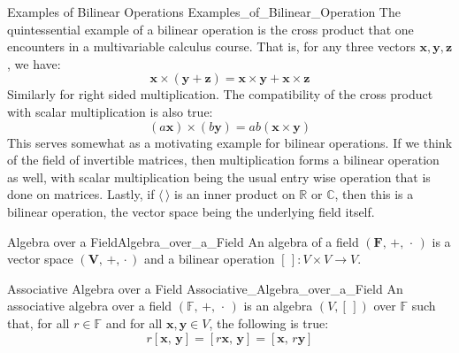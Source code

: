     \begin{lexample}{Examples of Bilinear Operations}
                    {Examples_of_Bilinear_Operation}
        The quintessential example of a bilinear operation is the
        cross product that one encounters in a multivariable calculus
        course. That is, for any three vectors
        $\mathbf{x},\mathbf{y},\mathbf{z}$, we have:
        \begin{equation}
            \mathbf{x}\times(\mathbf{y}+\mathbf{z})=
            \mathbf{x}\times\mathbf{y}+\mathbf{x}\times\mathbf{z}
        \end{equation}
        Similarly for right sided multiplication. The compatibility of
        the cross product with scalar multiplication is also true:
        \begin{equation}
            (a\mathbf{x})\times(b\mathbf{y})=ab(\mathbf{x}\times\mathbf{y})
        \end{equation}
        This serves somewhat as a motivating example for bilinear
        operations. If we think of the field of invertible matrices,
        then multiplication forms a bilinear operation as well, with
        scalar multiplication being the usual entry wise operation that
        is done on matrices. Lastly, if $\langle\,\rangle$ is an inner
        product on $\mathbb{R}$ or $\mathbb{C}$, then this is a bilinear
        operation, the vector space being the underlying field itself.
    \end{lexample}
    \begin{fdefinition}{Algebra over a Field}{Algebra_over_a_Field}
        An algebra of a field $(\mathbf{F},\,+,\,\cdot\,)$ is a
        vector space $(\mathbf{V},\,\boldsymbol{+},\,\boldsymbol{\cdot}\,)$
        and a bilinear operation $[\,]:V\times{V}\rightarrow{V}$.
    \end{fdefinition}
    \begin{fdefinition}{Associative Algebra over a Field}
                       {Associative_Algebra_over_a_Field}
        An associative algebra over a field $(\mathbb{F},\,+,\,\cdot\,)$
        is an algebra $(V,[\,])$ over $\mathbb{F}$ such that, for all
        $r\in\mathbb{F}$ and for all $\mathbf{x},\mathbf{y}\in{V}$,
        the following is true:
        \begin{equation}
            r[\mathbf{x},\,\mathbf{y}]=[r\mathbf{x},\,\mathbf{y}]
                                      =[\mathbf{x},\,r\mathbf{y}]
        \end{equation}
    \end{fdefinition}

